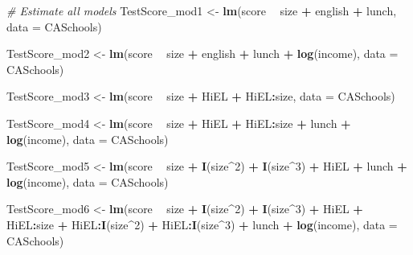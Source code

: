 \documentclass[]{book}
\newenvironment{Shaded}{\begin{snugshade}}{\end{snugshade}}
\newcommand{\KeywordTok}[1]{\textcolor[rgb]{0.13,0.29,0.53}{\textbf{#1}}}
\newcommand{\DataTypeTok}[1]{\textcolor[rgb]{0.13,0.29,0.53}{#1}}
\newcommand{\DecValTok}[1]{\textcolor[rgb]{0.00,0.00,0.81}{#1}}
\newcommand{\StringTok}[1]{\textcolor[rgb]{0.31,0.60,0.02}{#1}}
\newcommand{\CommentTok}[1]{\textcolor[rgb]{0.56,0.35,0.01}{\textit{#1}}}
\newcommand{\OperatorTok}[1]{\textcolor[rgb]{0.81,0.36,0.00}{\textbf{#1}}}
\newcommand{\NormalTok}[1]{#1}
\theoremstyle{definition}
\theoremstyle{definition}
\theoremstyle{definition}
\theoremstyle{remark}
\begin{document}
\begin{Shaded}
\begin{Highlighting}[]
\CommentTok{# Estimate all models}
\NormalTok{TestScore_mod1 <-}\StringTok{ }\KeywordTok{lm}\NormalTok{(score }\OperatorTok{~}\StringTok{ }\NormalTok{size }\OperatorTok{+}\StringTok{ }\NormalTok{english }\OperatorTok{+}\StringTok{ }\NormalTok{lunch, }\DataTypeTok{data =}\NormalTok{ CASchools)}

\NormalTok{TestScore_mod2 <-}\StringTok{ }\KeywordTok{lm}\NormalTok{(score }\OperatorTok{~}\StringTok{ }\NormalTok{size }\OperatorTok{+}\StringTok{ }\NormalTok{english }\OperatorTok{+}\StringTok{ }\NormalTok{lunch }\OperatorTok{+}\StringTok{ }\KeywordTok{log}\NormalTok{(income), }\DataTypeTok{data =}\NormalTok{ CASchools)}

\NormalTok{TestScore_mod3 <-}\StringTok{ }\KeywordTok{lm}\NormalTok{(score }\OperatorTok{~}\StringTok{ }\NormalTok{size }\OperatorTok{+}\StringTok{ }\NormalTok{HiEL }\OperatorTok{+}\StringTok{ }\NormalTok{HiEL}\OperatorTok{:}\NormalTok{size, }\DataTypeTok{data =}\NormalTok{ CASchools)}

\NormalTok{TestScore_mod4 <-}\StringTok{ }\KeywordTok{lm}\NormalTok{(score }\OperatorTok{~}\StringTok{ }\NormalTok{size }\OperatorTok{+}\StringTok{ }\NormalTok{HiEL }\OperatorTok{+}\StringTok{ }\NormalTok{HiEL}\OperatorTok{:}\NormalTok{size }\OperatorTok{+}\StringTok{ }\NormalTok{lunch }\OperatorTok{+}\StringTok{ }\KeywordTok{log}\NormalTok{(income), }
    \DataTypeTok{data =}\NormalTok{ CASchools)}

\NormalTok{TestScore_mod5 <-}\StringTok{ }\KeywordTok{lm}\NormalTok{(score }\OperatorTok{~}\StringTok{ }\NormalTok{size }\OperatorTok{+}\StringTok{ }\KeywordTok{I}\NormalTok{(size}\OperatorTok{^}\DecValTok{2}\NormalTok{) }\OperatorTok{+}\StringTok{ }\KeywordTok{I}\NormalTok{(size}\OperatorTok{^}\DecValTok{3}\NormalTok{) }\OperatorTok{+}\StringTok{ }\NormalTok{HiEL }\OperatorTok{+}\StringTok{ }\NormalTok{lunch }\OperatorTok{+}\StringTok{ }\KeywordTok{log}\NormalTok{(income), }
    \DataTypeTok{data =}\NormalTok{ CASchools)}

\NormalTok{TestScore_mod6 <-}\StringTok{ }\KeywordTok{lm}\NormalTok{(score }\OperatorTok{~}\StringTok{ }\NormalTok{size }\OperatorTok{+}\StringTok{ }\KeywordTok{I}\NormalTok{(size}\OperatorTok{^}\DecValTok{2}\NormalTok{) }\OperatorTok{+}\StringTok{ }\KeywordTok{I}\NormalTok{(size}\OperatorTok{^}\DecValTok{3}\NormalTok{) }\OperatorTok{+}\StringTok{ }\NormalTok{HiEL }\OperatorTok{+}\StringTok{ }\NormalTok{HiEL}\OperatorTok{:}\NormalTok{size }\OperatorTok{+}\StringTok{ }
\StringTok{    }\NormalTok{HiEL}\OperatorTok{:}\KeywordTok{I}\NormalTok{(size}\OperatorTok{^}\DecValTok{2}\NormalTok{) }\OperatorTok{+}\StringTok{ }\NormalTok{HiEL}\OperatorTok{:}\KeywordTok{I}\NormalTok{(size}\OperatorTok{^}\DecValTok{3}\NormalTok{) }\OperatorTok{+}\StringTok{ }\NormalTok{lunch }\OperatorTok{+}\StringTok{ }\KeywordTok{log}\NormalTok{(income), }\DataTypeTok{data =}\NormalTok{ CASchools)}


\end{Highlighting}
\end{Shaded}
\end{document}
